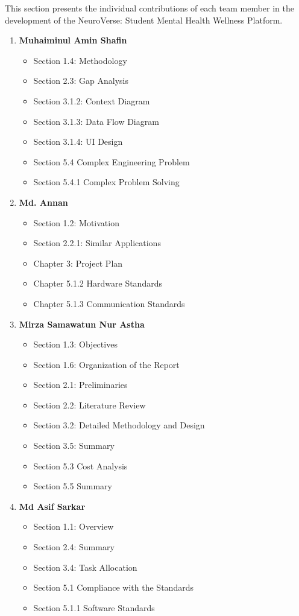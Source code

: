 \documentclass[a4paper,11pt]{report}
\begin{document}
This section presents the individual contributions of each team member in the development of the NeuroVerse: Student Mental Health Wellness Platform.

\begin{enumerate}
\item \textbf{Muhaiminul Amin Shafin}
\begin{itemize}
\item Section 1.4: Methodology
\item Section 2.3: Gap Analysis
\item Section 3.1.2: Context Diagram
\item Section 3.1.3: Data Flow Diagram
\item Section 3.1.4: UI Design
\item Section 5.4 Complex Engineering Problem
\item Section 5.4.1 Complex Problem Solving
\end{itemize}

\item\textbf{Md. Annan}
\begin{itemize}
\item Section 1.2: Motivation
\item Section 2.2.1: Similar Applications
\item Chapter 3: Project Plan
\item Chapter 5.1.2 Hardware Standards
\item Chapter 5.1.3 Communication Standards
\end{itemize}

\item\textbf{Mirza Samawatun Nur Astha}
\begin{itemize}
\item Section 1.3: Objectives
\item Section 1.6: Organization of the Report
\item Section 2.1: Preliminaries
\item Section 2.2: Literature Review
\item Section 3.2: Detailed Methodology and Design
\item Section 3.5: Summary
\item Section 5.3 Cost Analysis
\item Section 5.5 Summary 
\end{itemize}

\item\textbf{Md Asif Sarkar}
\begin{itemize}
\item Section 1.1: Overview
\item Section 2.4: Summary
\item Section 3.4: Task Allocation
\item Section 5.1 Compliance with the Standards
\item Section 5.1.1 Software Standards
\end{itemize}


\end{enumerate}
\end{document}
